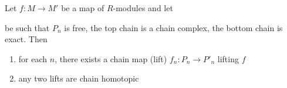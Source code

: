 \documentclass{report}
\begin{document}
\begin{theorem}
    Let $f: M \to M'$ be a map of $R$-modules and let
    \begin{center}
    \end{center}
    be such that $P_n$ is free, the top chain is a chain complex, the bottom chain is exact. Then
    \begin{enumerate}
        \item for each $n$, there exists a chain map (lift) $f_n: P_n \to P'_n$ lifting $f$
        \item any two lifts are chain homotopic
    \end{enumerate}
\end{theorem}
\end{document}
